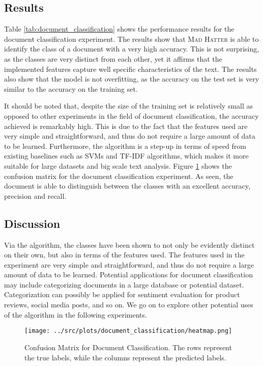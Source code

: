 \subsection*{Results}
Table \ref{tab:document_classification} shows the performance results for the document classification experiment. The results show that \textsc{Mad Hatter} is able to identify the class of a document with a very high accuracy. This is not surprising, as the classes are very distinct from each other, yet it affirms that the implemented features capture well specific characteristics of the text. The results also show that the model is not overfitting, as the accuracy on the test set is very similar to the accuracy on the training set.

It should be noted that, despite the size of the training set is relatively small as opposed to other experiments in the field of document classification, the accuracy achieved is remarkably high. This is due to the fact that the features used are very simple and straightforward, and thus do not require a large amount of data to be learned. Furthermore, the algorithm is a step-up in terms of speed from existing baselines such as SVMs and TF-IDF algorithms, which makes it more suitable for large datasets and big scale text analysis. Figure \ref{fig:cmatrix_document_classification} shows the confusion matrix for the document classification experiment. As seen, the document is able to distinguish between the classes with an excellent accuracy, precision and recall.

\subsection*{Discussion}
Via the algorithm, the classes have been shown to not only be evidently distinct on their own, but also in terms of the features used. The features used in the experiment are very simple and straightforward, and thus do not require a large amount of data to be learned. Potential applications for document classification may include categorizing documents in a large database or potential dataset. Categorization can possibly be applied for sentiment evaluation for product reviews, social media posts, and so on. We go on to explore other potential uses of the algorithm in the following experiments.

\begin{figure}[htbp]
    \centering
    \texttt{[image: ../src/plots/document\_classification/heatmap.png]} 
    \caption{Confusion Matrix for Document Classification. The rows represent the true labels, while the columns represent the predicted labels.}
    \label{fig:cmatrix_document_classification}
\end{figure}